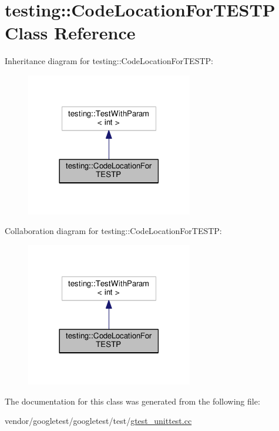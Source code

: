 \hypertarget{classtesting_1_1CodeLocationForTESTP}{}\section{testing\+:\+:Code\+Location\+For\+T\+E\+S\+TP Class Reference}
\label{classtesting_1_1CodeLocationForTESTP}


Inheritance diagram for testing\+:\+:Code\+Location\+For\+T\+E\+S\+TP\+:
\nopagebreak
\begin{figure}[H]
\begin{center}
\leavevmode
\includegraphics[width=206pt]{classtesting_1_1CodeLocationForTESTP__inherit__graph}
\end{center}
\end{figure}


Collaboration diagram for testing\+:\+:Code\+Location\+For\+T\+E\+S\+TP\+:
\nopagebreak
\begin{figure}[H]
\begin{center}
\leavevmode
\includegraphics[width=206pt]{classtesting_1_1CodeLocationForTESTP__coll__graph}
\end{center}
\end{figure}


The documentation for this class was generated from the following file\+:\begin{DoxyCompactItemize}
\item 
vendor/googletest/googletest/test/\hyperlink{gtest__unittest_8cc}{gtest\+\_\+unittest.\+cc}\end{DoxyCompactItemize}
